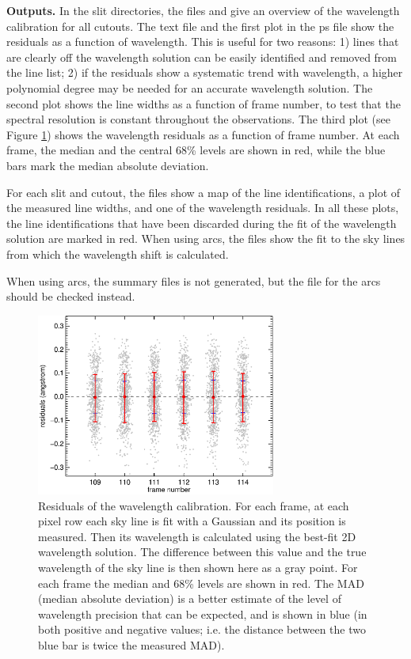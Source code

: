 \documentclass[a4paper]{article}
\begin{document}
\begin{sloppypar}
\medskip
\noindent
\textbf{Outputs.} In the slit directories, the files  and   give an overview of the wavelength calibration for all cutouts. The text file and the first plot in the ps file show the residuals as a function of wavelength. This is useful for two reasons: 1) lines that are clearly off the wavelength solution can be easily identified and removed from the line list; 2) if the residuals show a systematic trend with wavelength, a higher polynomial degree may be needed for an accurate wavelength solution. The second plot shows the line widths as a function of frame number, to test that the spectral resolution is constant throughout the observations. The third plot (see Figure \ref{fig:residuals}) shows the wavelength residuals as a function of frame number. At each frame, the median and the central 68\% levels are shown in red, while the blue bars mark the median absolute deviation.

For each slit and cutout, the  files show a map of the line identifications, a plot of the measured line widths, and one of the wavelength residuals. In all these plots, the line identifications that have been discarded during the fit of the wavelength solution are marked in red. When using arcs, the  files show the fit to the sky lines from which the wavelength shift is calculated.

When using arcs, the summary files is not generated, but the  file for the arcs should be checked instead.

\begin{figure}[tbp]
\centering
\includegraphics[width=0.7\textwidth]{residuals}
\caption{Residuals of the wavelength calibration. For each frame, at each pixel row each sky line is fit with a Gaussian and its position is measured. Then its wavelength is calculated using the best-fit 2D wavelength solution. The difference between this value and the true wavelength of the sky line is then shown here as a gray point. For each frame the median and 68\% levels are shown in red. The MAD (median absolute deviation) is a better estimate of the level of wavelength precision that can be expected, and is shown in blue (in both positive and negative values; i.e. the distance between the two blue bar is twice the measured MAD).}
\label{fig:residuals}
\end{figure}



\end{sloppypar}
\end{document}
